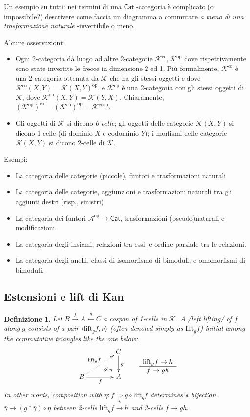\documentclass[11pt]{article}
\def\Cat{\mathsf{Cat}}
\def\xto#1{\xrightarrow{#1}}
\def\xot#1{\xleftarrow{#1}}
\def\To{\Rightarrow}
\newcommand{\deduction}[4]{\begin{array}{c} #1 \to #2 \\ \hline #3 \to #4 \end{array}}
\newcommand{\Nearrow}{\rotatebox[origin=c]{45}{$\Rightarrow$}}  %
\def\opp{\mathrm{op}}
\def\co{\mathrm{co}}
\def\leeft{\mathrm{lift}} %
\theoremstyle{reference}
\newtheorem{definition}[theorem]{Definizione}
\begin{document}
Un esempio su tutti: nei termini di una \(\Cat\) -categoria è
complicato (o impossibile?) descrivere come faccia un
diagramma a commutare \emph{a meno di una trasformazione
naturale} -invertibile o meno.

Alcune osservazioni:

\begin{itemize}
\item Ogni 2-categoria dà luogo ad altre 2-categorie \(\mathcal
  K^\co, \mathcal K^\opp\) dove rispettivamente sono state
invertite le frecce in dimensione 2 ed 1. Più formalmente,
\(\mathcal K^\co\) è una 2-categoria ottenuta da \(\mathcal
  K\) che ha gli stessi oggetti e dove \(\mathcal K^\co(X,Y) =
  \mathcal K(X,Y)^\opp\), e \(\mathcal K^\opp\) è una
2-categoria con gli stessi oggetti di \(\mathcal K\), dove
\(\mathcal K^\opp(X,Y) = \mathcal K(Y,X)\). Chiaramente,
\((\mathcal K^\opp)^\co = (\mathcal K^\co)^\opp = \mathcal
  K^\text{coop}\).
\item Gli oggetti di \(\mathcal K\) si dicono \emph{0-celle}; gli
oggetti delle categorie \({\mathcal K}(X,Y)\) si dicono
1-celle (di dominio \(X\) e codominio \(Y\)); i morfismi delle
categorie \({\mathcal K}(X,Y)\) si dicono 2-celle di
\(\mathcal K\).
\end{itemize}

Esempi:

\begin{itemize}
\item La categoria delle categorie (piccole), funtori e
trasformazioni naturali
\item La categoria delle categorie, aggiunzioni e trasformazioni
naturali tra gli aggiunti destri (risp., sinistri)
\item La categoria dei funtori \(\mathcal A^\opp\to \Cat\),
trasformazioni (pseudo)naturali e modificazioni.
\item La categoria degli insiemi, relazioni tra essi, e ordine
parziale tra le relazioni.
\item La categoria degli anelli, classi di isomorfismo di
bimoduli, e omomorfismi di bimoduli.
\end{itemize}


\subsection{Estensioni e lift di Kan}
\label{sec:org52ef62a}

\begin{definition}
Let $B \xto{f} A \xot{g}C$ a cospan of
1-cells in ${\mathcal K}$. A /left lifting/ of $f$ along $g$
consists of a pair $\langle\leeft_gf,\eta\rangle$ (often
denoted simply as $\leeft_gf$) initial among the commutative
triangles like the one below: 
\[
\vcenter{\xymatrix@C=1.4cm{& C\ar[d]^g \\ B\ar[r]_f
\ar@{.>}[ur]^{\leeft_gf} & \ar@{}[ul]|(.3){\Nearrow\eta} A}}
\qquad \deduction{\leeft_gf}{h}{f}{gh} 
\] In other words,
composition with $\eta \colon f \To g \circ \leeft_gf$
determines a bijection $\bar\gamma \mapsto (g *
\bar\gamma)\circ \eta$ between 2-cells $\leeft_gf
\xto{\bar\gamma} h$ and 2-cells $f \to gh$.
\end{definition}
\end{document}
